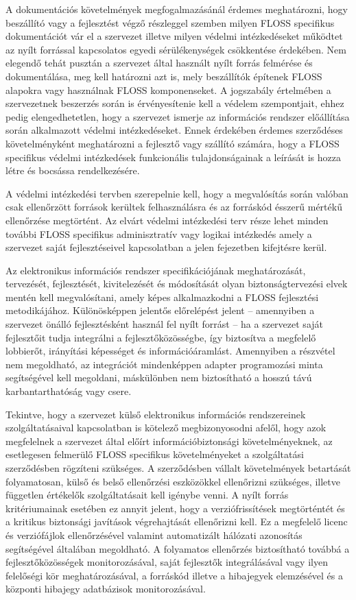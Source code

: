 \documentclass[12pt,magyar,a4paper,oneside]{scrreprt}
\begin{document}
A dokumentációs követelmények megfogalmazásánál érdemes meghatározni,
hogy beszállító vagy a fejlesztést végző részleggel szemben milyen FLOSS
specifikus dokumentációt vár el a szervezet illetve milyen védelmi
intézkedéseket működtet az nyílt forrással kapcsolatos egyedi
sérülékenységek csökkentése érdekében. Nem elegendő tehát pusztán a
szervezet által használt nyílt forrás felmérése és dokumentálása, meg
kell határozni azt is, mely beszállítók építenek FLOSS alapokra vagy
használnak FLOSS komponenseket. A jogszabály értelmében a szervezetnek
beszerzés során is érvényesítenie kell a védelem szempontjait, ehhez
pedig elengedhetetlen, hogy a szervezet ismerje az információs rendszer
előállítása során alkalmazott védelmi intézkedéseket. Ennek érdekében
érdemes szerződéses követelményként meghatározni a fejlesztő vagy
szállító számára, hogy a FLOSS specifikus védelmi intézkedések
funkcionális tulajdonságainak a leírását is hozza létre és bocsássa
rendelkezésére.

A védelmi intézkedési tervben szerepelnie kell, hogy a megvalósítás
során valóban csak ellenőrzött források kerültek felhasználásra és az
forráskód ésszerű mértékű ellenőrzése megtörtént. Az elvárt védelmi
intézkedési terv része lehet minden további FLOSS specifikus
adminisztratív vagy logikai intézkedés amely a szervezet saját
fejlesztéseivel kapcsolatban a jelen fejezetben kifejtésre kerül.

Az elektronikus információs rendszer specifikációjának meghatározását,
tervezését, fejlesztését, kivitelezését és módosítását olyan
biztonságtervezési elvek mentén kell megvalósítani, amely képes
alkalmazkodni a FLOSS fejlesztési metodikájához. Különösképpen jelentős
előrelépést jelent -- amennyiben a szervezet önálló fejlesztésként
használ fel nyílt forrást -- ha a szervezet saját fejlesztőit tudja
integrálni a fejlesztőközösségbe, így biztosítva a megfelelő lobbierőt,
irányítási képességet és információáramlást. Amennyiben a részvétel nem
megoldható, az integrációt mindenképpen adapter programozási minta
segítségével kell megoldani, máskülönben nem biztosítható a hosszú távú
karbantarthatóság vagy csere.

Tekintve, hogy a szervezet külső elektronikus információs rendszereinek
szolgáltatásaival kapcsolatban is kötelező megbizonyosodni afelől, hogy
azok megfelelnek a szervezet által előírt információbiztonsági
követelményeknek, az esetlegesen felmerülő FLOSS specifikus
követelményeket a szolgáltatási szerződésben rögzíteni szükséges. A
szerződésben vállalt követelmények betartását folyamatosan, külső és
belső ellenőrzési eszközökkel ellenőrizni szükséges, illetve független
értékelők szolgáltatásait kell igénybe venni. A nyílt forrás
kritériumainak esetében ez annyit jelent, hogy a verziófrissítések
megtörténtét és a kritikus biztonsági javítások végrehajtását
ellenőrizni kell. Ez a megfelelő licenc és verziófájlok ellenőrzésével
valamint automatizált hálózati azonosítás segítségével általában
megoldható. A folyamatos ellenőrzés biztosítható továbbá a
fejlesztőközösségek monitorozásával, saját fejlesztők integrálásával
vagy ilyen felelőségi kör meghatározásával, a forráskód illetve a
hibajegyek elemzésével és a központi hibajegy adatbázisok
monitorozásával.
\end{document}
